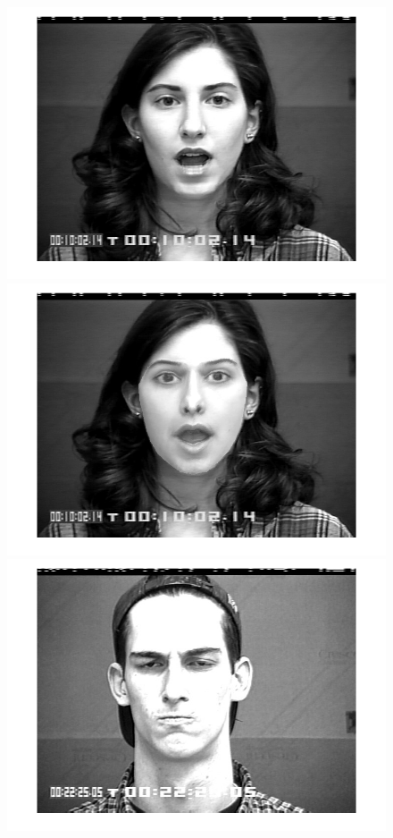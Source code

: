 \begin{figure}[!htb]
    	\includegraphics[scale=.10]{figure/77/07.png}
    	\includegraphics[scale=.10]{figure/77de/07.png}
    	\hspace{1cm}
    	\includegraphics[scale=.10]{figure/89/16.png}

\end{figure}
